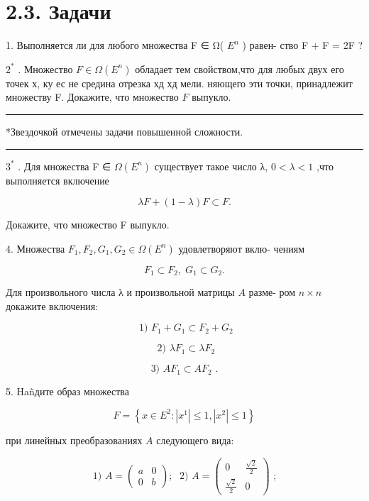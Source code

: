 \documentclass[8pt]{extarticle}
\newcommand{\HRule}{\begin{center}\rule{0.9\linewidth}{0.2mm}\end{center}}
\begin{document}
\section*{2.3. Задачи}

1. Выполняется ли для любого множества F ∈ Ω( \({E}^{n}\) ) равен- ство F + F = 2F ?

\({2}^{ * }\) . Множество \(F \in  \Omega \left( {E}^{n}\right)\) обладает тем свойством,что для любых двух его точек х, ку ес не средина отрезка хд хд мели. няющего эти точки, принадлежит множеству F. Докажите, что множество \(F\) выпукло.

\HRule

*Звездочкой отмечены задачи повышенной сложности.

\HRule

\({3}^{ * }\) . Для множества F ∈ \(\Omega \left( {E}^{n}\right)\) существует такое число λ, \(0 < \lambda  < 1\) ,что выполняется включение

\[
{\lambda F} + \left( {1 - \lambda }\right) F \subset  F.
\]

Докажите, что множество F выпукло.

4. Множества \({F}_{1},{F}_{2},{G}_{1},{G}_{2} \in  \Omega \left( {E}^{n}\right)\) удовлетворяют вклю- чениям

\[
{F}_{1} \subset  {F}_{2},\;{G}_{1} \subset  {G}_{2}.
\]

Для произвольного числа λ и произвольной матрицы \(A\) разме- ром \(n \times  n\) докажите включения:

\[
\text{ 1) }{F}_{1} + {G}_{1} \subset  {F}_{2} + {G}_{2}
\]

\[
\text{ 2) }\lambda {F}_{1} \subset  \lambda {F}_{2}
\]

\[
\text{ 3) }A{F}_{1} \subset  A{F}_{2}\text{ . }
\]

5. Hañдите образ множества

\[
F = \left\{  {x \in  {E}^{2} : \left| {x}^{1}\right|  \leq  1,\left| {x}^{2}\right|  \leq  1}\right\}
\]

при линейных преобразованиях \(A\) следующего вида:

\[
\text{ 1) }A = \left( \begin{array}{ll} a & 0 \\  0 & b \end{array}\right) ;\;\text{ 2) }A = \left( \begin{array}{cc} 0 & \frac{\sqrt{2}}{2} \\  \frac{\sqrt{2}}{2} & 0 \end{array}\right) \text{ ; }
\]
\end{document}
